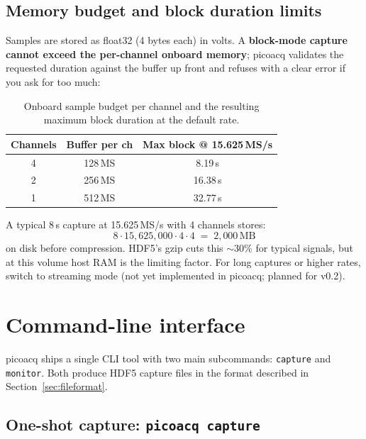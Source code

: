 \documentclass[11pt]{article}
\begin{document}
\subsection{Memory budget and block duration limits}

Samples are stored as float32 (4 bytes each) in volts.  A
\textbf{block-mode capture cannot exceed the per-channel onboard
memory}; \textsf{picoacq} validates the requested duration against
the buffer up front and refuses with a clear error if you ask for
too much:

\begin{table}[h]
\centering
\begin{tabular}{ccc}
\toprule
\textbf{Channels} & \textbf{Buffer per ch} & \textbf{Max block @ 15.625\,MS/s} \\
\midrule
4 & 128\,MS & 8.19\,s \\
2 & 256\,MS & 16.38\,s \\
1 & 512\,MS & 32.77\,s \\
\bottomrule
\end{tabular}
\caption{Onboard sample budget per channel and the resulting maximum
block duration at the default rate.}
\label{tab:bufferbudget}
\end{table}

A typical 8\,s capture at 15.625\,MS/s with 4 channels stores:
\[
8 \cdot 15{,}625{,}000 \cdot 4 \cdot 4 \;=\; 2{,}000\,\text{MB}
\]
on disk before compression.  HDF5's gzip cuts this $\sim$30\% for
typical signals, but at this volume host RAM is the limiting factor.
For long captures or higher rates, switch to streaming mode (not yet
implemented in \textsf{picoacq}; planned for v0.2).



\section{Command-line interface}

\textsf{picoacq} ships a single CLI tool with two main subcommands:
\texttt{capture} and \texttt{monitor}.  Both produce HDF5 capture files
in the format described in Section~\ref{sec:fileformat}.

\subsection{One-shot capture: \texttt{picoacq capture}}
\end{document}
